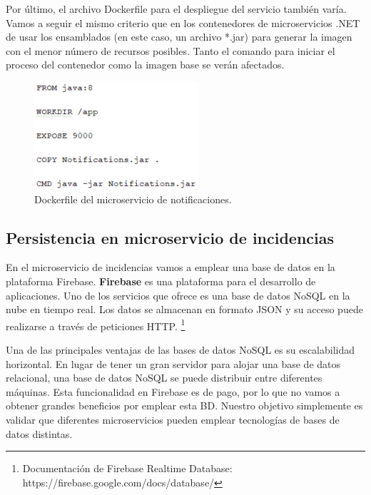 \documentclass[11pt,spanish,listoffigures]{tfgetsinf}
\begin{document}
Por último, el archivo Dockerfile para el despliegue del servicio también varía. Vamos a seguir el mismo criterio que en los contenedores de microservicios .NET de usar los ensamblados (en este caso, un archivo *.jar) para generar la imagen con el menor número de recursos posibles. Tanto el comando para iniciar el proceso del contenedor como la imagen base se verán afectados.

\begin{figure}[h]
\centering
\includegraphics[scale=1]{JavaDockerfile}
\caption{Dockerfile del microservicio de notificaciones.}
\end{figure}

\subsection{Persistencia en microservicio de incidencias}

En el microservicio de incidencias vamos a emplear una base de datos en la plataforma Firebase. \textbf{Firebase} es una plataforma para el desarrollo de aplicaciones. Uno de los servicios que ofrece es una base de datos NoSQL en la nube en tiempo real. Los datos se almacenan en formato JSON y su acceso puede realizarse a través de peticiones HTTP. \footnote{ Documentación de Firebase Realtime Database: https://firebase.google.com/docs/database/} 

Una de las principales ventajas de las bases de datos NoSQL es su escalabilidad horizontal. En lugar de tener un gran servidor para alojar una base de datos relacional, una base de datos NoSQL se puede distribuir entre diferentes máquinas. Esta funcionalidad en Firebase es de pago, por lo que no vamos a obtener grandes beneficios por emplear esta BD. Nuestro objetivo simplemente es validar que diferentes microservicios pueden emplear tecnologías de bases de datos distintas.

\newpage
\end{document}
